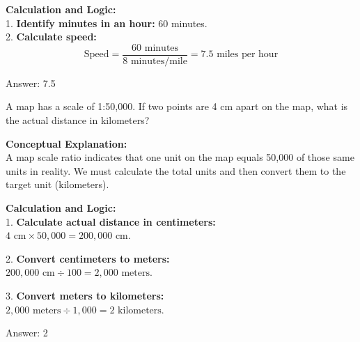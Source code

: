 \documentclass[11pt,paper=a4,answers]{exam}
\begin{document}
\begin{questions}
\begin{solution}
\vspace{30pt}

\textbf{Calculation and Logic:} \\
1. \textbf{Identify minutes in an hour:} 60 minutes. \\
2. \textbf{Calculate speed:} \\
\[ \text{Speed} = \frac{60 \text{ minutes}}{8 \text{ minutes/mile}} = 7.5 \text{ miles per hour} \]

\vspace{30pt}

Answer: \colorbox{yellow!100}{7.5}
\end{solution}

\vspace{60pt}

\question
A map has a scale of 1:50,000. If two points are 4 cm apart on the map, what is the actual distance in kilometers?

\begin{solution}
\textbf{Conceptual Explanation:} \\
A map scale ratio indicates that one unit on the map equals 50,000 of those same units in reality. We must calculate the total units and then convert them to the target unit (kilometers).

\vspace{30pt}

\textbf{Calculation and Logic:} \\
1. \textbf{Calculate actual distance in centimeters:} \\
$4 \text{ cm} \times 50,000 = 200,000 \text{ cm}$.

\vspace{15pt}

2. \textbf{Convert centimeters to meters:} \\
$200,000 \text{ cm} \div 100 = 2,000 \text{ meters}$.

\vspace{15pt}

3. \textbf{Convert meters to kilometers:} \\
$2,000 \text{ meters} \div 1,000 = 2 \text{ kilometers}$.

\vspace{30pt}

Answer: \colorbox{yellow!100}{2}
\end{solution}

\vspace{60pt}


\end{questions}
\end{document}
